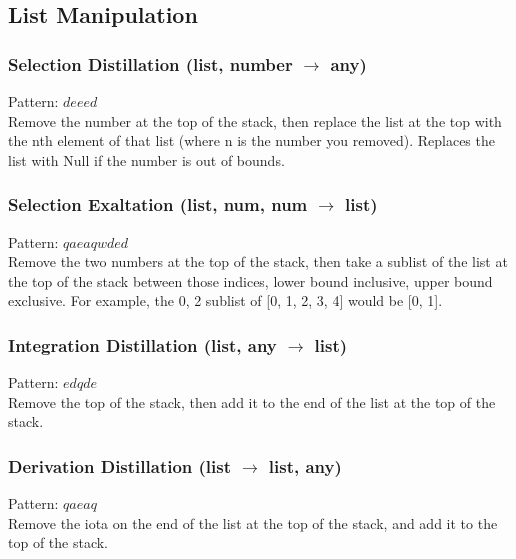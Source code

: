 \documentclass[12pt]{article}
\begin{document}
\newpage

\label{sec:patterns/lists}
\subsection*{List Manipulation}


  \label{sec: patterns/lists@hexcasting:index}
\subsubsection*{Selection Distillation (list, number $\rightarrow$ any)}

    Pattern: $deeed$\\
      Remove the number at the top of the stack, then replace the list at the top with the nth element of that list (where n is the number you removed). Replaces the list with Null if the number is out of bounds.\\


  \label{sec: patterns/lists@hexcasting:slice}
\subsubsection*{Selection Exaltation (list, num, num $\rightarrow$ list)}

    Pattern: $qaeaqwded$\\
      Remove the two numbers at the top of the stack, then take a sublist of the list at the top of the stack between those indices, lower bound inclusive, upper bound exclusive. For example, the 0, 2 sublist of [0, 1, 2, 3, 4] would be [0, 1].\\


  \label{sec: patterns/lists@hexcasting:append}
\subsubsection*{Integration Distillation (list, any $\rightarrow$ list)}

    Pattern: $edqde$\\
      Remove the top of the stack, then add it to the end of the list at the top of the stack.\\


  \label{sec: patterns/lists@hexcasting:unappend}
\subsubsection*{Derivation Distillation (list $\rightarrow$ list, any)}

    Pattern: $qaeaq$\\
      Remove the iota on the end of the list at the top of the stack, and add it to the top of the stack.\\
\end{document}
